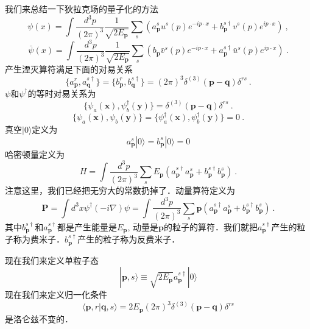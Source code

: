 
我们来总结一下狄拉克场的量子化的方法
\begin{equation}
\psi(x) = \int \frac{d^3 p}{(2\pi)^3} \frac{1}{\sqrt{2 E_{\mathbf p}}} \sum_s (a_{\mathbf p}^s u^s (p) e^{-ip\cdot x} + b_{\mathbf p}^{s\dagger} v^s(p) e^{ip\cdot x})~,
\end{equation}
\begin{equation}
\bar \psi (x) = \int \frac{d^3 p}{(2\pi)^3} \frac{1}{\sqrt{2 E_{\mathbf p}}} \sum_s (b_{\mathbf p}\bar v ^s(p) e^{- i p\cdot x}+ a_{\mathbf p}^{s\dagger} \bar u^s(p)e^{i p \cdot x})~.
\end{equation}
产生湮灭算符满足下面的对易关系
\begin{equation}
\{a_{\mathbf p}^r,a_{\mathbf q}^{s\dagger}\} = \{b_{\mathbf p}^r,b_{\mathbf q}^{s\dagger}\} = (2\pi)^3\delta^{(3)}(\mathbf p - \mathbf q)\delta^{rs}~.
\end{equation}
$\psi$和$\psi^\dagger$的等时对易关系为
\begin{equation}
\{\psi_a(\mathbf x),\psi_b^\dagger(\mathbf y)\} = \delta^{(3)}(\mathbf p - \mathbf q)\delta^{rs}~.
\end{equation}
\begin{equation}
\{\psi_a(\mathbf x),\psi_b(\mathbf y)\} = \{\psi_a^\dagger(\mathbf x),\psi_b^\dagger(\mathbf y)\} = 0 ~.
\end{equation}
真空$|0\rangle$定义为
\begin{equation}
a_{\mathbf p }^s|0\rangle = b_{\mathbf p}^s|0\rangle = 0
\end{equation}
哈密顿量定义为
\begin{equation}
H = \int \frac{d^3p}{(2\pi)^3}\sum_s E_{\mathbf p} (a^{s\dagger}_{\mathbf p}a^{s}_{\mathbf p}+b^{s\dagger}_{\mathbf p}b_{\mathbf p}^s)~.
\end{equation}
注意这里，我们已经把无穷大的常数扔掉了．动量算符定义为
\begin{equation}
\mathbf P = \int d^3 x \psi^\dagger (-i\nabla)\psi = \int \frac{d^3 p}{(2\pi)^3} \sum_s \mathbf p (a_{\mathbf p}^{s\dagger} a_{\mathbf p}^s+b_{\mathbf p}^{s\dagger}b_{\mathbf p}^s)~.
\end{equation}
其中$b_{\mathbf p}^{s\dagger}$和$a_{\mathbf p}^{s\dagger}$都是产生能量是$E_{\mathbf p}$, 动量是$\mathbf p$的粒子的算符．我们就把$a_{\mathbf p}^{s\dagger}$产生的粒子称为费米子．$b_{\mathbf p}^{s\dagger}$产生的粒子称为反费米子．

现在我们来定义单粒子态
\begin{equation}
|\mathbf p,s\rangle \equiv \sqrt{2 E_{\mathbf p}} a_{\mathbf p}^{s\dagger} | 0 \rangle 
\end{equation}
现在我们来定义归一化条件
\begin{equation}
\langle \mathbf p,r|\mathbf q,s\rangle = 2 E_{\mathbf p}(2\pi)^3\delta^{(3)}(\mathbf p - \mathbf q) \delta^{rs}
\end{equation}
是洛仑兹不变的．


